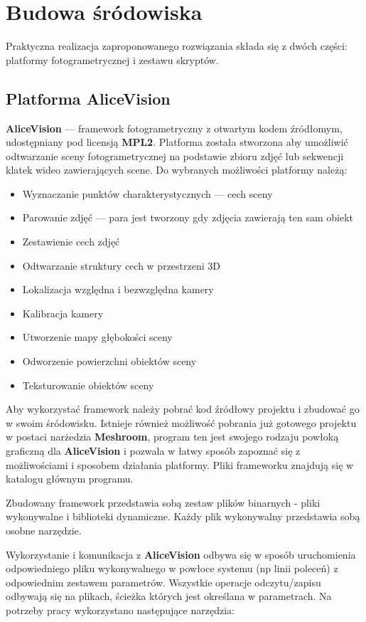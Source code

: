 \chapter{Budowa śródowiska}

Praktyczna realizacja zaproponowanego rozwiązania składa się z dwóch części: platformy fotogrametrycznej i zestawu skryptów.

\section{Platforma AliceVision}

\textbf{AliceVision} --- framework fotogrametryczny z otwartym kodem źródłomym, udostępniany pod licensją \textbf{MPL2}.
Platforma została stworzona aby umożliwić odtwarzanie sceny fotogrametrycznej na podstawie zbioru zdjęć lub sekwencji klatek wideo zawierających scene.
Do wybranych możliwości platformy należą:
\begin{itemize}
   \item Wyznaczanie punktów charakterystycznych --- cech sceny
   \item Parowanie zdjęć --- para jest tworzony gdy zdjęcia zawierają ten sam obiekt
   \item Zestawienie cech zdjęć
   \item Odtwarzanie struktury cech w przestrzeni 3D
   \item Lokalizacja względna i bezwzględna kamery
   \item Kalibracja kamery
   \item Utworzenie mapy głębokości sceny
   \item Odworzenie powierzchni obiektów sceny
   \item Teksturowanie obiektów sceny
\end{itemize}

Aby wykorzystać framework należy pobrać kod źródłowy projektu i zbudować go w swoim śródowisku.
Istnieje również możliwość pobrania już gotowego projektu w postaci narżedzia \textbf{Meshroom}, program ten jest swojego rodzaju powłoką graficzną dla \textbf{AliceVision} i pozwala w łatwy sposób zapoznać się z możliwościami i sposobem działania platformy.
Pliki frameworku znajdują się w katalogu głównym programu.

Zbudowany framework przedstawia sobą zestaw plików binarnych - pliki wykonywalne i biblioteki dynamiczne.
Każdy plik wykonywalny przedstawia sobą osobne narzędzie.

Wykorzystanie i komunikacja z \textbf{AliceVision} odbywa się w sposób uruchomienia odpowiedniego pliku wykonywalnego w powłoce systemu (np linii poleceń) z odpowiednim zestawem parametrów.
Wszystkie operacje odczytu/zapisu odbywają się na plikach, ścieżka których jest określana w parametrach.
Na potrzeby pracy wykorzystano następujące narzędzia:

